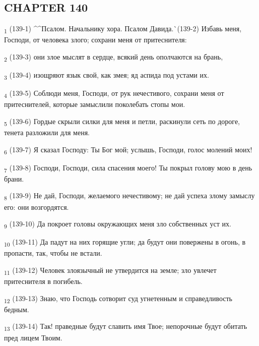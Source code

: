 \subsection{CHAPTER 140}
\begin{tcolorbox}
\textsubscript{1} (139-1) ^^Псалом. Начальнику хора. Псалом Давида.^^ (139-2) Избавь меня, Господи, от человека злого; сохрани меня от притеснителя:
\end{tcolorbox}
\begin{tcolorbox}
\textsubscript{2} (139-3) они злое мыслят в сердце, всякий день ополчаются на брань,
\end{tcolorbox}
\begin{tcolorbox}
\textsubscript{3} (139-4) изощряют язык свой, как змея; яд аспида под устами их.
\end{tcolorbox}
\begin{tcolorbox}
\textsubscript{4} (139-5) Соблюди меня, Господи, от рук нечестивого, сохрани меня от притеснителей, которые замыслили поколебать стопы мои.
\end{tcolorbox}
\begin{tcolorbox}
\textsubscript{5} (139-6) Гордые скрыли силки для меня и петли, раскинули сеть по дороге, тенета разложили для меня.
\end{tcolorbox}
\begin{tcolorbox}
\textsubscript{6} (139-7) Я сказал Господу: Ты Бог мой; услышь, Господи, голос молений моих!
\end{tcolorbox}
\begin{tcolorbox}
\textsubscript{7} (139-8) Господи, Господи, сила спасения моего! Ты покрыл голову мою в день брани.
\end{tcolorbox}
\begin{tcolorbox}
\textsubscript{8} (139-9) Не дай, Господи, желаемого нечестивому; не дай успеха злому замыслу его: они возгордятся.
\end{tcolorbox}
\begin{tcolorbox}
\textsubscript{9} (139-10) Да покроет головы окружающих меня зло собственных уст их.
\end{tcolorbox}
\begin{tcolorbox}
\textsubscript{10} (139-11) Да падут на них горящие угли; да будут они повержены в огонь, в пропасти, так, чтобы не встали.
\end{tcolorbox}
\begin{tcolorbox}
\textsubscript{11} (139-12) Человек злоязычный не утвердится на земле; зло увлечет притеснителя в погибель.
\end{tcolorbox}
\begin{tcolorbox}
\textsubscript{12} (139-13) Знаю, что Господь сотворит суд угнетенным и справедливость бедным.
\end{tcolorbox}
\begin{tcolorbox}
\textsubscript{13} (139-14) Так! праведные будут славить имя Твое; непорочные будут обитать пред лицем Твоим.
\end{tcolorbox}
